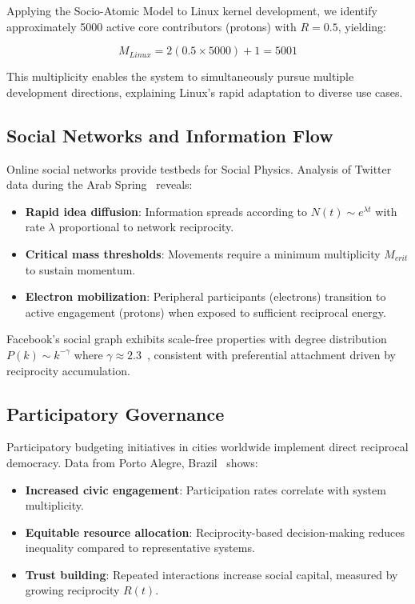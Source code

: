 \documentclass[11pt,a4paper]{article}
\begin{document}
Applying the Socio-Atomic Model to Linux kernel development, we identify approximately 5000 active core contributors (protons) with $R = 0.5$, yielding:

\begin{equation}
M_{Linux} = 2(0.5 \times 5000) + 1 = 5001
\end{equation}

This multiplicity enables the system to simultaneously pursue multiple development directions, explaining Linux's rapid adaptation to diverse use cases.

\subsection{Social Networks and Information Flow}

Online social networks provide testbeds for Social Physics. Analysis of Twitter data during the Arab Spring~\cite{howard2011} reveals:

\begin{itemize}
    \item \textbf{Rapid idea diffusion}: Information spreads according to $N(t) \sim e^{\lambda t}$ with rate $\lambda$ proportional to network reciprocity.
    \item \textbf{Critical mass thresholds}: Movements require a minimum multiplicity $M_{crit}$ to sustain momentum.
    \item \textbf{Electron mobilization}: Peripheral participants (electrons) transition to active engagement (protons) when exposed to sufficient reciprocal energy.
\end{itemize}

Facebook's social graph exhibits scale-free properties with degree distribution $P(k) \sim k^{-\gamma}$ where $\gamma \approx 2.3$~\cite{facebook2012}, consistent with preferential attachment driven by reciprocity accumulation.

\subsection{Participatory Governance}

Participatory budgeting initiatives in cities worldwide implement direct reciprocal democracy. Data from Porto Alegre, Brazil~\cite{baiocchi2005} shows:

\begin{itemize}
    \item \textbf{Increased civic engagement}: Participation rates correlate with system multiplicity.
    \item \textbf{Equitable resource allocation}: Reciprocity-based decision-making reduces inequality compared to representative systems.
    \item \textbf{Trust building}: Repeated interactions increase social capital, measured by growing reciprocity $R(t)$.
\end{itemize}
\end{document}
